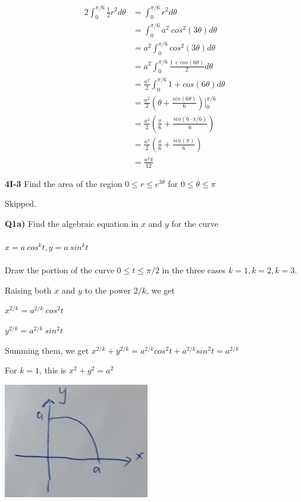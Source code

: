 \documentclass[9pt]{article}
\begin{document}
\begin{align*}
  2 \int_0^{\pi / 6} \frac{1}{2} r^2 d \theta &= \int_0^{\pi / 6} r^2 d \theta \\
  &= \int_0^{\pi / 6} a^2\ cos^2(3 \theta) d \theta \\
  &= a^2 \int_0^{\pi / 6} cos^2(3 \theta) d \theta \\
  &= a^2 \int_0^{\pi / 6} \frac{1 + cos(6 \theta)}{2} d \theta \\
  &= \frac{a^2}{2} \int_0^{\pi / 6} 1 + cos(6 \theta) d \theta \\
  &= \frac{a^2}{2} (\theta + \frac{sin(6 \theta)}{6}) \bigg]_0^{\pi / 6} \\
  &= \frac{a^2}{2} (\frac{\pi}{6} + \frac{sin(6 \cdot \pi / 6)}{6}) \\
  &= \frac{a^2}{2} (\frac{\pi}{6} + \frac{sin(\pi)}{6}) \\
  &= \frac{a^2 \pi}{12}
\end{align*}


\begin{tcolorbox}
  \textbf{4I-3} Find the area of the region $0 \leq r \leq e^{3 \theta}$ for $0 \leq \theta \leq \pi$
\end{tcolorbox}

Skipped.


\begin{tcolorbox}
  \textbf{Q1a)} Find the algebraic equation in $x$ and $y$ for the curve \\
  \\
  $x = a\ cos^k t, y = a \ sin^k t$ \\
  \\
  Draw the portion of the curve $0 \leq t \leq \pi / 2$ in the three cases $k = 1, k = 2, k = 3$.
\end{tcolorbox}

Raising both $x$ and $y$ to the power $2/k$, we get

$x^{2/k} = a^{2/k} \ cos^2 t$

$y^{2/k} = a^{2/k} \ sin^2 t$

Summing them, we get $x^{2/k} + y^{2/k} = a^{2/k} cos^2 t + a^{2/k} sin^2 t = a^{2/k}$

For $k = 1$, this is $x^2 + y^2 = a^2$

\begin{center}
  \includegraphics[scale=0.8]{1_keq1.jpg}
\end{center}
\end{document}
